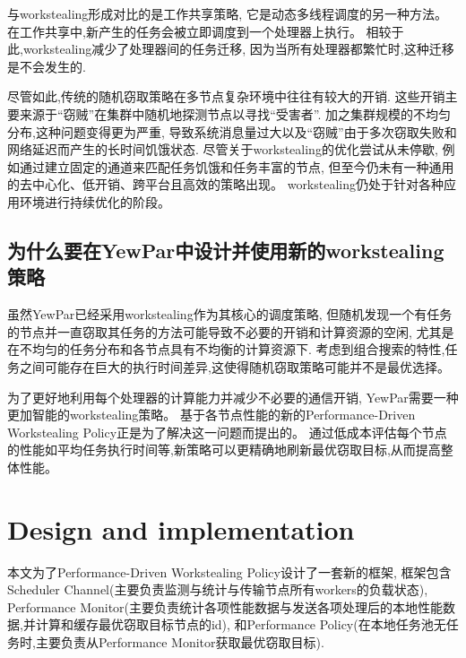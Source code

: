 \documentclass{mproj}
\begin{document}
与workstealing形成对比的是工作共享策略,
它是动态多线程调度的另一种方法。
在工作共享中,新产生的任务会被立即调度到一个处理器上执行。
相较于此,workstealing减少了处理器间的任务迁移,
因为当所有处理器都繁忙时,这种迁移是不会发生的.\cite{10.1145/324133.324234}

尽管如此,传统的随机窃取策略在多节点复杂环境中往往有较大的开销.
这些开销主要来源于“窃贼”在集群中随机地探测节点以寻找“受害者”.
加之集群规模的不均匀分布,这种问题变得更为严重,
导致系统消息量过大以及“窃贼”由于多次窃取失败和网络延迟而产生的长时间饥饿状态.
尽管关于workstealing的优化尝试从未停歇,
例如通过建立固定的通道来匹配任务饥饿和任务丰富的节点\cite{10.1145/3016078.2851175},
但至今仍未有一种通用的去中心化、低开销、跨平台且高效的策略出现。
workstealing仍处于针对各种应用环境进行持续优化的阶段。

\section{为什么要在YewPar中设计并使用新的workstealing策略}

虽然YewPar已经采用workstealing作为其核心的调度策略,
但随机发现一个有任务的节点并一直窃取其任务的方法可能导致不必要的开销和计算资源的空闲,
尤其是在不均匀的任务分布和各节点具有不均衡的计算资源下.
考虑到组合搜索的特性,任务之间可能存在巨大的执行时间差异,这使得随机窃取策略可能并不是最优选择。

为了更好地利用每个处理器的计算能力并减少不必要的通信开销,
YewPar需要一种更加智能的workstealing策略。
基于各节点性能的新的Performance-Driven Workstealing Policy正是为了解决这一问题而提出的。
通过低成本评估每个节点的性能如平均任务执行时间等,新策略可以更精确地刷新最优窃取目标,从而提高整体性能。

\chapter{Design and implementation}

本文为了Performance-Driven Workstealing Policy设计了一套新的框架,
框架包含Scheduler Channel(主要负责监测与统计与传输节点所有workers的负载状态),
Performance Monitor(主要负责统计各项性能数据与发送各项处理后的本地性能数据,并计算和缓存最优窃取目标节点的id),
和Performance Policy(在本地任务池无任务时,主要负责从Performance Monitor获取最优窃取目标).
\end{document}
